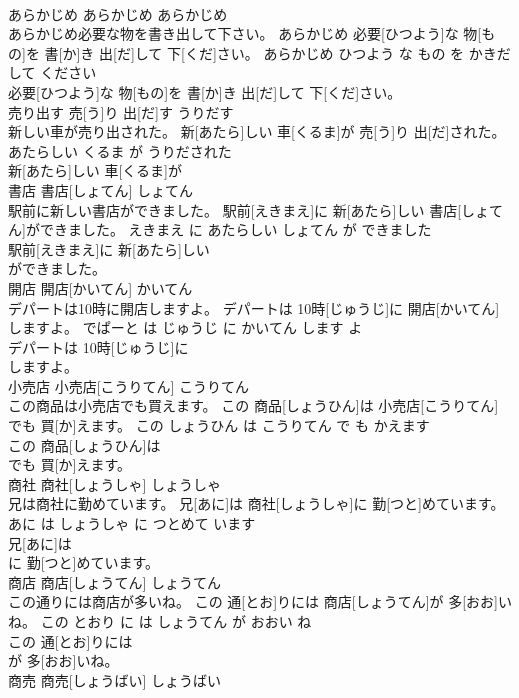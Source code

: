 \documentclass[8pt]{extreport}
\begin{document}
\begin{CJK}{UTF8}{min}
\\	あらかじめ	あらかじめ	あらかじめ	
\\	あらかじめ必要な物を書き出して下さい。	あらかじめ 必要[ひつよう]な 物[もの]を 書[か]き 出[だ]して 下[くだ]さい。	あらかじめ ひつよう な もの を かきだして ください	
\\	必要[ひつよう]な 物[もの]を 書[か]き 出[だ]して 下[くだ]さい。			
\\	売り出す	売[う]り 出[だ]す	うりだす	
\\	新しい車が売り出された。	新[あたら]しい 車[くるま]が 売[う]り 出[だ]された。	あたらしい くるま が うりだされた	
\\	新[あたら]しい 車[くるま]が
\\	書店	書店[しょてん]	しょてん	
\\	駅前に新しい書店ができました。	駅前[えきまえ]に 新[あたら]しい 書店[しょてん]ができました。	えきまえ に あたらしい しょてん が できました	
\\	駅前[えきまえ]に 新[あたら]しい
\\	ができました。			
\\	開店	開店[かいてん]	かいてん	
\\	デパートは10時に開店しますよ。	デパートは 10時[じゅうじ]に 開店[かいてん]しますよ。	でぱーと は じゅうじ に かいてん します よ	
\\	デパートは 10時[じゅうじ]に
\\	しますよ。			
\\	小売店	小売店[こうりてん]	こうりてん	
\\	この商品は小売店でも買えます。	この 商品[しょうひん]は 小売店[こうりてん]でも 買[か]えます。	この しょうひん は こうりてん で も かえます	
\\	この 商品[しょうひん]は
\\	でも 買[か]えます。			
\\	商社	商社[しょうしゃ]	しょうしゃ	
\\	兄は商社に勤めています。	兄[あに]は 商社[しょうしゃ]に 勤[つと]めています。	あに は しょうしゃ に つとめて います	
\\	兄[あに]は
\\	に 勤[つと]めています。			
\\	商店	商店[しょうてん]	しょうてん	
\\	この通りには商店が多いね。	この 通[とお]りには 商店[しょうてん]が 多[おお]いね。	この とおり に は しょうてん が おおい ね	
\\	この 通[とお]りには
\\	が 多[おお]いね。			
\\	商売	商売[しょうばい]	しょうばい	

\end{CJK}
\end{document}

